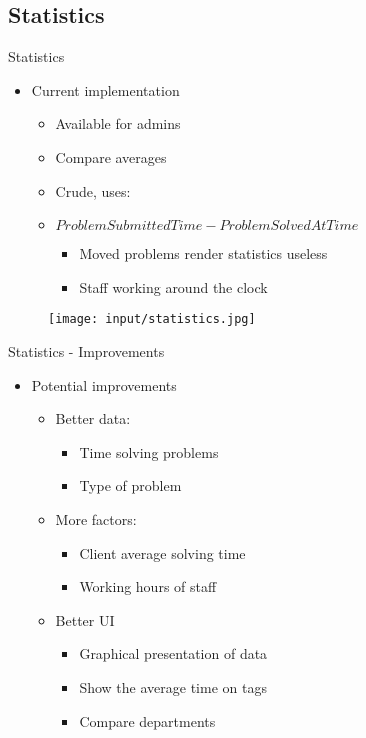 \subsection{Statistics}
\begin{frame}{Statistics}

\begin{itemize}
\item <1-> Current implementation
	\begin{itemize}
	\item<2-> Available for admins
	\item<3-> Compare averages
	\item<4-> Crude, uses:
	\item<4-> \begin{math}Problem Submitted Time - Problem Solved At Time\end{math}
		\begin{itemize}
		\item<5-> Moved problems render statistics useless
		\item<6-> Staff working around the clock
		\end{itemize}
	\end{itemize}
\end{itemize}

\begin{figure}[htbp]
	\begin{center}
	\texttt{[image: input/statistics.jpg]}
	\end{center}
\end{figure}

\end{frame}

\begin{frame}{Statistics - Improvements}

\begin{itemize}
\item<1-> Potential improvements
	\begin{itemize}
	\item<2-> Better data:
		\begin{itemize}
		\item<3-> Time solving problems
		\item<4-> Type of problem
		\end{itemize}
	\item<5-> More factors:
		\begin{itemize}
		\item<6-> Client average solving time
		\item<7-> Working hours of staff
		\end{itemize}
	\item<8-> Better UI
		\begin{itemize}
		\item<9-> Graphical presentation of data
		\item<10-> Show the average time on tags
		\item<11-> Compare departments
		\end{itemize}
	\end{itemize}
\end{itemize}

\end{frame}